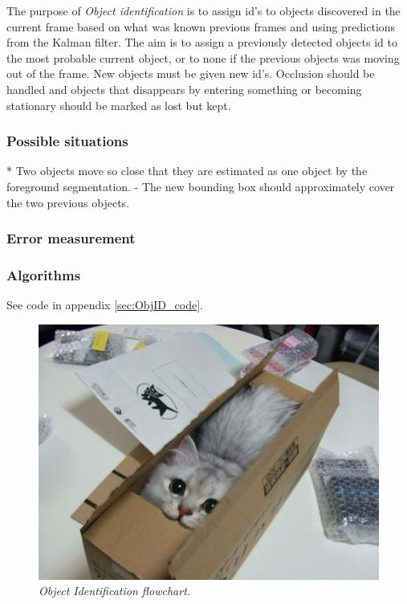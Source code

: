 The purpose of \emph{Object identification} is to assign id's to objects discovered in the current frame based on what was known previous frames and using predictions from the Kalman filter. The aim is to assign a previously detected objects id to the most probable current object, or to none if the previous objects was moving out of the frame. New objects must be given new id's. Occlusion should be handled and objects that disappears by entering something or becoming stationary should be marked as lost but kept.

\subsubsection{Possible situations}
* Two objects move so close that they are estimated as one object by the foreground segmentation.
- The new bounding box should approximately cover the two previous objects.


\subsubsection{Error measurement}



\subsubsection{Algorithms}
See code in appendix \ref{sec:ObjID_code}. %

\begin{figure}[htb]
	\centering
	\includegraphics[width=\linewidth]{images/acatisfinetoo}
	\caption{\textit{Object Identification flowchart.}}
	\label{fig:ObjID_fig} %
\end{figure}

